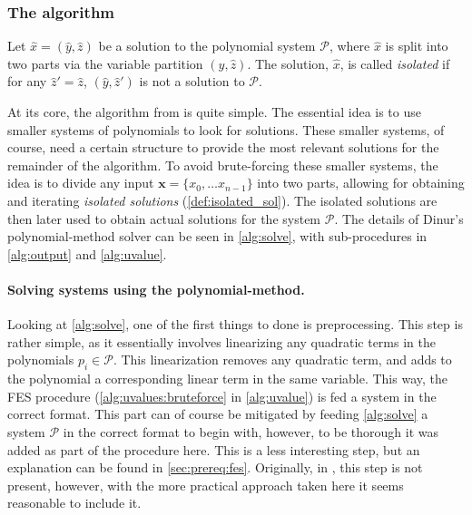 \subsubsection{The algorithm} \label{sec:prereq:dinur_alg}
\begin{defn} \label{def:isolated_sol}
    Let $\hat{x} = (\hat{y}, \hat{z})$ be a solution to the polynomial system $\mathcal{P}$, where $\hat{x}$ is split into two parts via the variable partition $(\hat{y}, \hat{z})$. The solution, $\hat{x}$, is called \textit{isolated} if for any $\hat{z}' = \hat{z}$, $(\hat{y}, \hat{z}')$ is not a solution to $\mathcal{P}$.
\end{defn}

At its core, the algorithm from \cite{eurocrypt-2021-30841} is quite simple. The essential idea is to use smaller systems of polynomials to look for solutions. These smaller systems, of course, need a certain structure to provide the most relevant solutions for the remainder of the algorithm. To avoid brute-forcing these smaller systems, the idea is to divide any input $\mathbf{x} = \{x_0, \dots x_{n - 1}\}$ into two parts, allowing for obtaining and iterating \textit{isolated solutions} (\cref{def:isolated_sol}). The isolated solutions are then later used to obtain actual solutions for the system $\mathcal{P}$. The details of Dinur's polynomial-method solver can be seen in \cref{alg:solve}, with sub-procedures in \cref{alg:output} and \cref{alg:uvalue}.

\paragraph{Solving systems using the polynomial-method.} Looking at \cref{alg:solve}, one of the first things to done is preprocessing. This step is rather simple, as it essentially involves linearizing any quadratic terms in the polynomials $p_i \in \mathcal{P}$. This linearization removes any quadratic term, and adds to the polynomial a corresponding linear term in the same variable. This way, the FES procedure (\cref{alg:uvalues:bruteforce} in \cref{alg:uvalue}) is fed a system in the correct format. This part can of course be mitigated by feeding \cref{alg:solve} a system $\mathcal{P}$ in the correct format to begin with, however, to be thorough it was added as part of the procedure here. This is a less interesting step, but an explanation can be found in \cref{sec:prereq:fes}. Originally, in \cite{eurocrypt-2021-30841}, this step is not present, however, with the more practical approach taken here it seems reasonable to include it.

